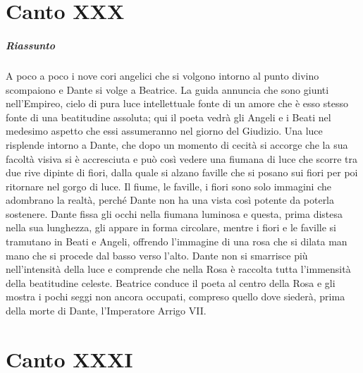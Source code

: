 \documentclass[a4paper, twoside, titlepage]{book}
\newcounter{mar}
\begin{document}
\chapter{Canto XXX}

\paragraph{Riassunto} A poco a poco i nove cori angelici che si volgono intorno al punto divino scompaiono e Dante si volge a Beatrice. La guida annuncia che sono giunti nell’Empireo, cielo di pura luce intellettuale fonte di un amore che è esso stesso fonte di una beatitudine assoluta; qui il poeta vedrà gli Angeli e i Beati nel medesimo aspetto che essi assumeranno nel giorno del Giudizio. Una luce risplende intorno a Dante, che dopo un momento di cecità si accorge che la sua facoltà visiva si è accresciuta e può così vedere una fiumana di luce che scorre tra due rive dipinte di fiori, dalla quale si alzano faville che si posano sui fiori per poi ritornare nel gorgo di luce. Il fiume, le faville, i fiori sono solo immagini che adombrano la realtà, perché Dante non ha una vista così potente da poterla sostenere. Dante fissa gli occhi nella fiumana luminosa e questa, prima distesa nella sua lunghezza, gli appare in forma circolare, mentre i fiori e le faville si tramutano in Beati e Angeli, offrendo l’immagine di una rosa che si dilata man mano che si procede dal basso verso l’alto. Dante non si smarrisce più nell’intensità della luce e comprende che nella Rosa è raccolta tutta l’immensità della beatitudine celeste. Beatrice conduce il poeta al centro della Rosa e gli mostra i pochi seggi non ancora occupati, compreso quello dove siederà, prima della morte di Dante, l’Imperatore Arrigo VII.

\chapter{Canto XXXI}
\end{document}
